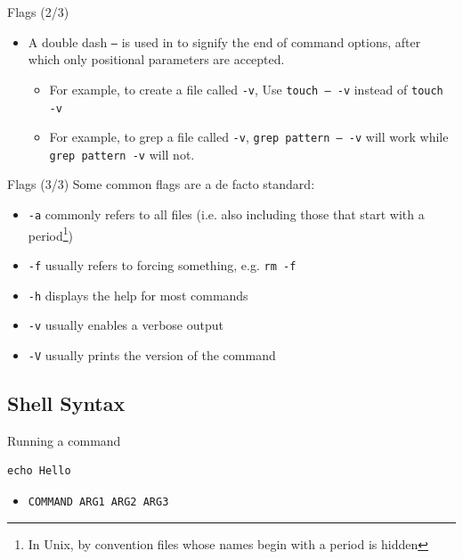 \documentclass[12pt]{beamer}
\begin{document}
\begin{frame}[fragile]{Flags (2/3)}
  \begin{itemize}
    \item A double dash \texttt{--} is used in to signify the end of command options, after which only positional parameters are accepted.
          \begin{itemize}
            \item For example, to create a file called \texttt{-v}, Use \texttt{touch -- -v} instead of \texttt{touch -v}
            \item For example, to grep a file called \texttt{-v}, \texttt{grep pattern -- -v} will work while \texttt{grep pattern -v} will not.
          \end{itemize}
  \end{itemize}
\end{frame}

\begin{frame}[fragile]{Flags (3/3)}
  Some common flags are a de facto standard:
  \begin{itemize}
    \item \texttt{-a} commonly refers to all files (i.e. also including those that start with a period\footnote{In Unix, by convention files whose names begin with a period is hidden})
    \item \texttt{-f} usually refers to forcing something, e.g. \texttt{rm -f}
    \item \texttt{-h} displays the help for most commands
    \item \texttt{-v} usually enables a verbose output
    \item \texttt{-V} usually prints the version of the command
  \end{itemize}
\end{frame}

\subsection{Shell Syntax}
\begin{frame}[fragile]{Running a command}
  \begin{verbatim}
echo Hello
\end{verbatim}
  \begin{itemize}
    \item \texttt{COMMAND ARG1 ARG2 ARG3}
  \end{itemize}
\end{frame}
\end{document}
